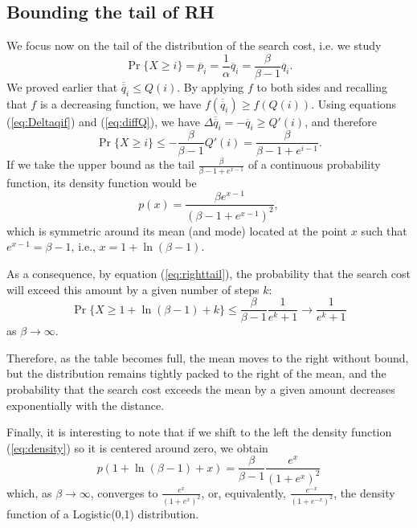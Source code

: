 \documentclass[proceedings]{aofa}
\newcommand{\tail}[1]{\overline{#1}}
\newcommand{\ttail}[1]{\tail{\tail{#1}}}
\begin{document}
\subsection{Bounding the tail of RH}

We focus now on the tail of the distribution of the search cost, i.e. we study
\begin{equation}
\Pr\{X\ge i\} = \tail{p}_i =
\frac{1}{\alpha}\tail{q}_i =
\frac{\beta}{\beta-1}\tail{q}_i.
\end{equation}
We proved earlier that $\ttail{q}_i \le Q(i)$. By applying $f$ to both 
sides and recalling that $f$ is a decreasing function, we have
$f(\ttail{q}_i) \ge f(Q(i))$.
Using equations (\ref{eq:Deltaqif}) and (\ref{eq:diffQ}), we have
$\Delta \ttail{q}_i = -\tail{q}_i \ge Q'(i)$,
and therefore
\begin{equation}\label{eq:righttail}
\Pr\{X\ge i\} \le -\frac{\beta}{\beta-1} Q'(i) =
\frac{\beta}{\beta-1+e^{i-1}}.
\end{equation}
If we take the upper bound as the tail $\frac{\beta}{\beta-1+e^{x-1}}$ of a continuous probability function, its density function would be
\begin{equation}\label{eq:density}
p(x) = \frac{\beta e^{x-1}}{(\beta-1+e^{x-1})^2},
\end{equation}
which is symmetric around its mean (and mode) located at the point $x$ such that $e^{x-1}=\beta-1$, i.e., $x=1+\ln{(\beta-1)}$.

As a consequence, by equation (\ref{eq:righttail}), the probability that the search cost will exceed this amount by a given number of steps $k$:
\begin{equation}
\Pr\{X \ge 1+\ln{(\beta-1)+k}\} \le \frac{\beta}{\beta-1} \frac{1}{e^k+1}
                                                \rightarrow \frac{1}{e^k+1}
\end{equation}
as $\beta \rightarrow \infty$.

Therefore, as the table becomes full, the mean moves to the right without bound, but the distribution remains tightly packed to the right of the mean, and the probability that the search cost exceeds the mean by a given amount decreases exponentially with the distance.

Finally, it is interesting to note that if we shift to the left the density function (\ref{eq:density}) so it is centered around zero, we obtain
\begin{equation}
p(1+\ln{(\beta-1)}+x) = \frac{\beta}{\beta-1} \frac{e^x}{(1+e^x)^2}
\end{equation}
which, as $\beta \rightarrow \infty$, converges to $\frac{e^x}{(1+e^x)^2}$, or, equivalently, $\frac{e^{-x}}{(1+e^{-x})^2}$, the density function of a Logistic(0,1) distribution.
\end{document}

